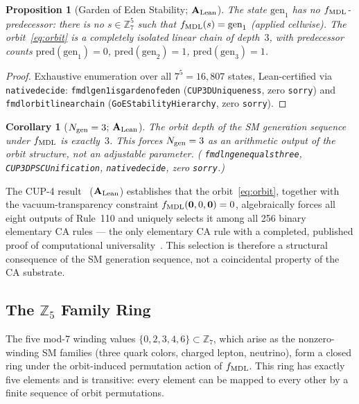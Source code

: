 \documentclass[11pt]{article}
\newtheorem{proposition}[theorem]{Proposition}
\newtheorem{corollary}[theorem]{Corollary}
\theoremstyle{remark}
\newcommand{\Ngen}{N_{\rm gen}}
\newcommand{\lean}[1]{%
  \penalty-100
  \begingroup\def\_{\textunderscore\allowbreak}\texttt{#1}\endgroup}
\newcommand{\CatAL}{\ensuremath{\textbf{A}_{\rm Lean}}}
\begin{document}
\begin{proposition}[Garden of Eden Stability; $\CatAL$]
\label{prop:goe}
The state $\mathrm{gen}_1$ has no $f_{\rm MDL}$-predecessor: there is no
$s \in \mathbb{Z}_7^5$ such that $f_{\rm MDL}(s) = \mathrm{gen}_1$ (applied
cellwise).
The orbit~\eqref{eq:orbit} is a completely isolated linear chain of
depth~$3$, with predecessor counts
$\mathrm{pred}(\mathrm{gen}_1) = 0$,
$\mathrm{pred}(\mathrm{gen}_2) = 1$,
$\mathrm{pred}(\mathrm{gen}_3) = 1$.
\end{proposition}

\begin{proof}
Exhaustive enumeration over all $7^5 = 16{,}807$ states, Lean-certified via
\lean{native\_decide}:
\lean{fmdl\_gen1\_is\_garden\_of\_eden} (\texttt{CUP3DUniqueness}, zero \texttt{sorry})
and
\lean{fmdl\_orbit\_linear\_chain} (\texttt{GoEStabilityHierarchy}, zero \texttt{sorry}).
\end{proof}

\begin{corollary}[$\Ngen = 3$; $\CatAL$]
\label{cor:ngen}
The orbit depth of the SM generation sequence under $f_{\rm MDL}$ is exactly~$3$.
This forces $\Ngen = 3$ as an arithmetic output of the orbit structure, not an
adjustable parameter.
(\lean{fmdl\_ngen\_equals\_three}, \texttt{CUP3DPSCUnification},
\lean{native\_decide}, zero \texttt{sorry}.)
\end{corollary}

The CUP-4 result~\cite{SpivackCompUniversality} ($\CatAL$) establishes that
the orbit~\eqref{eq:orbit}, together with the vacuum-transparency constraint
$f_{\rm MDL}(\mathbf{0},0,\mathbf{0}) = 0$, algebraically forces all eight outputs
of Rule~110 and uniquely selects it among all 256 binary elementary CA rules ---
the only elementary CA rule with a completed, published proof of computational
universality~\cite{Cook2004,Cook2009}. This selection is therefore a structural
consequence of the SM generation sequence, not a coincidental property of the CA
substrate.

\subsection{The \texorpdfstring{$\mathbb{Z}_5$}{Z5} Family Ring}
\label{sec:prelim_z5}

The five mod-7 winding values $\{0,2,3,4,6\} \subset \mathbb{Z}_7$, which arise as
the nonzero-winding SM families (three quark colors, charged lepton, neutrino),
form a closed ring under the orbit-induced permutation action of $f_{\rm MDL}$.
This ring has exactly five elements and is transitive: every element can be mapped
to every other by a finite sequence of orbit permutations.
\end{document}
